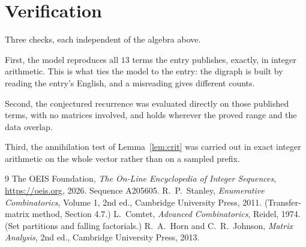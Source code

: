 \documentclass[11pt,a4paper]{article}
\theoremstyle{plain}
\theoremstyle{definition}
\begin{document}
\section{Verification}

Three checks, each independent of the algebra above.

First, the model reproduces all $13$ terms the entry publishes, exactly, in integer
arithmetic. This is what ties the model to the entry: the digraph is built by reading the
entry's English, and a misreading gives different counts.

Second, the conjectured recurrence was evaluated directly on those published terms, with no
matrices involved, and holds wherever the proved range and the data overlap.

Third, the annihilation test of Lemma~\ref{lem:crit} was carried out in exact integer
arithmetic on the whole vector rather than on a sampled prefix.

\begin{thebibliography}{9}
 The OEIS Foundation, \emph{The On-Line Encyclopedia of Integer
Sequences}, \url{https://oeis.org}, 2026. Sequence A205605.
 R.~P.~Stanley, \emph{Enumerative Combinatorics}, Volume 1, 2nd ed.,
Cambridge University Press, 2011. (Transfer-matrix method, Section 4.7.)
 L.~Comtet, \emph{Advanced Combinatorics}, Reidel, 1974. (Set partitions
and falling factorials.)
 R.~A.~Horn and C.~R.~Johnson, \emph{Matrix Analysis}, 2nd ed., Cambridge
University Press, 2013.
\end{thebibliography}
\end{document}
